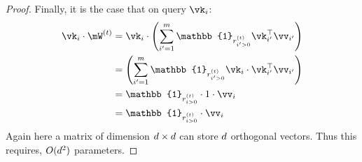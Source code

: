 \begin{proof}
    Finally, it is the case that on query $\vk_{i}$:
    \begin{align*}
        \vk_{i}\cdot \mW^{(\timestep)} &= \vk_{i} \cdot \left(\sum_{i'=1}^{\numPairs} \mathbb{1}_{r^{(t)}_{i'>0}} \vk_{i'}^{\top} \vv_{i'}\right) \\
        &=  \left(\sum_{i'=1}^{\numPairs} \mathbb{1}_{r^{(t)}_{i'>0}} \vk_{i} \cdot\vk_{i'}^{\top} \vv_{i'}\right) \\
        &=  \mathbb{1}_{r^{(t)}_{i>0}} \cdot 1 \cdot \vv_{i}\ \\
        &=  \mathbb{1}_{r^{(t)}_{i>0}}\cdot \vv_{i}\ \\
    \end{align*}
    Again here a matrix of dimension $d\times d$ can store $d$ orthogonal vectors. Thus this requires, $O(d^{2})$ parameters.
\end{proof}
